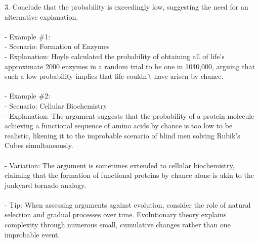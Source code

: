 \documentclass[a4paper,12pt,single,pdftex]{scrbook}
\begin{document}
    
        3. Conclude that the probability is exceedingly low, suggesting the need for an alternative explanation.
    \\

    
      
    \\

    
      - Example \#1:
    \\

    
        - Scenario: Formation of Enzymes
    \\

    
        - Explanation: Hoyle calculated the probability of obtaining all of life's approximate 2000 enzymes in a random trial to be one in 10\^40,000, arguing that such a low probability implies that life couldn't have arisen by chance.
    \\

    
      
    \\

    
      - Example \#2:
    \\

    
        - Scenario: Cellular Biochemistry
    \\

    
        - Explanation: The argument suggests that the probability of a protein molecule achieving a functional sequence of amino acids by chance is too low to be realistic, likening it to the improbable scenario of blind men solving Rubik's Cubes simultaneously.
    \\

    
      
    \\

    
      - Variation: The argument is sometimes extended to cellular biochemistry, claiming that the formation of functional proteins by chance alone is akin to the junkyard tornado analogy.
    \\

    
      
    \\

    
      - Tip: When assessing arguments against evolution, consider the role of natural selection and gradual processes over time. Evolutionary theory explains complexity through numerous small, cumulative changes rather than one improbable event.
    \\

    
      
\end{document}
